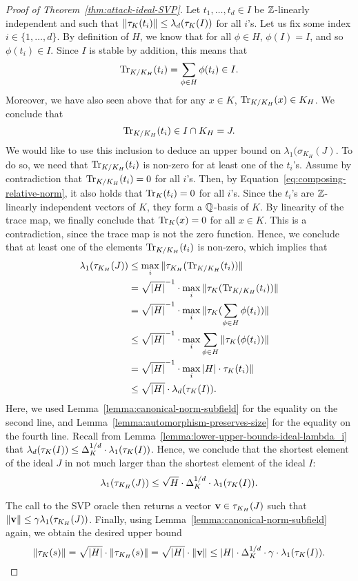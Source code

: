 \begin{proof}[Proof of Theorem~\ref{thm:attack-ideal-SVP}]
Let $t_1, \dots, t_d \in I$ be $\mathbb{Z}$-linearly independent and such that $\|\tau_K(t_i)\| \leq \lambda_d(\tau_K(I))$ for all $i$'s.
Let us fix some index $i \in \{1, \dots, d\}$.
By definition of $H$, we know that for all $\phi \in H$, $\phi(I) = I$, and so $\phi(t_i) \in I$. Since $I$ is stable by addition, this means that 
\[\mathrm{Tr}_{K/K_H}(t_i) = \sum_{\phi \in H} \phi(t_i) \in I.\]
Moreover, we have also seen above that for any $x \in K$, $\mathrm{Tr}_{K/K_H}(x) \in K_H$. We conclude that 
\[\mathrm{Tr}_{K/K_H}(t_i) \in I \cap K_H = J.\]
We would like to use this inclusion to deduce an upper bound on $\lambda_1(\sigma_{K_H}(J)$. To do so, we need that $\mathrm{Tr}_{K/K_H}(t_i)$ is non-zero for at least one of the $t_i$'s. Assume by contradiction that $\mathrm{Tr}_{K/K_H}(t_i) = 0$ for all $i$'s. Then, by Equation~\eqref{eq:composing-relative-norm}, it also holds that $\mathrm{Tr}_{K}(t_i) = 0$ for all $i$'s. Since the $t_i$'s are $\mathbb{Z}$-linearly independent vectors of $K$, they form a $\mathbb{Q}$-basis of $K$. By linearity of the trace map, we finally conclude that $\mathrm{Tr}_K(x) = 0$ for all $x \in K$. This is a contradiction, since the trace map is not the zero function. Hence, we conclude that at least one of the elements $\mathrm{Tr}_{K/K_H}(t_i)$ is non-zero, which implies that
\begin{align*}
\lambda_1(\tau_{K_H}(J)) &\leq \max_i \|\tau_{K_H}(\mathrm{Tr}_{K/K_H}(t_i))\| \\
& = \sqrt{|H|}^{-1} \cdot \max_i \|\tau_{K}(\mathrm{Tr}_{K/K_H}(t_i))\| \\
& = \sqrt{|H|}^{-1} \cdot \max_i \|\tau_{K}(\sum_{\phi \in H}\phi(t_i))\| \\
& \leq \sqrt{|H|}^{-1} \cdot \max_i \sum_{\phi \in H}\|\tau_{K}(\phi(t_i))\| \\
& = \sqrt{|H|}^{-1} \cdot \max_i |H| \cdot \tau_{K}(t_i)\| \\
& \leq \sqrt{|H|} \cdot \lambda_d(\tau_K(I)).
\end{align*}
Here, we used Lemma~\ref{lemma:canonical-norm-subfield} for the equality on the second line, and Lemma~\ref{lemma:automorphism-preserves-size} for the equality on the fourth line. Recall from Lemma~\ref{lemma:lower-upper-bounds-ideal-lambda_i} that $\lambda_d(\tau_K(I)) \leq \Delta_K^{1/d} \cdot \lambda_1(\tau_K(I))$. Hence, we conclude that the shortest element of the ideal $J$ in not much larger than the shortest element of the ideal $I$:
\[\lambda_1(\tau_{K_H}(J)) \leq \sqrt{H} \cdot \Delta_K^{1/d} \cdot \lambda_1(\tau_K(I)).\]

The call to the SVP oracle then returns a vector $\mathbf v \in \tau_{K_H}(J)$ such that $\|\mathbf v\| \leq \gamma \lambda_1(\tau_{K_H}(J))$. Finally, using Lemma~\ref{lemma:canonical-norm-subfield} again, we obtain the desired upper bound
\[ \|\tau_K(s)\| = \sqrt{|H|} \cdot \|\tau_{K_H}(s)\| = \sqrt{|H|} \cdot \|\mathbf v\| \leq |H| \cdot \Delta_K^{1/d} \cdot \gamma \cdot \lambda_1(\tau_K(I)).\]
\end{proof}

